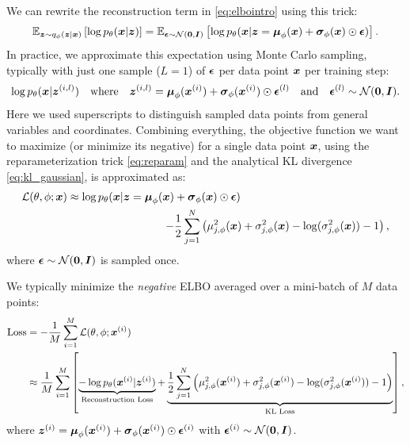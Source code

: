 We can rewrite the reconstruction term in \eqref{eq:elbointro} using this
trick:
\begin{align}
    \mathbb{E}_{\boldsymbol{z} \sim q_{\phi}(\boldsymbol{z}|\boldsymbol{x})} \left[ \log p_{\theta}(\boldsymbol{x}|\boldsymbol{z}) \right] = \mathbb{E}_{\boldsymbol{\epsilon} \sim \mathcal{N}(\mathbf{0}, \boldsymbol{I})} \left[ \log p_{\theta}(\boldsymbol{x}|\boldsymbol{z} = \boldsymbol{\mu}_{\phi}(\boldsymbol{x}) + \boldsymbol{\sigma}_{\phi}(\boldsymbol{x}) \odot \boldsymbol{\epsilon}) \right].
\end{align}
In practice, we approximate this expectation using Monte Carlo sampling, typically with just one sample ($L=1$) of $\boldsymbol{\epsilon}$ per data point $\boldsymbol{x}$ per training step:
\begin{align}
    \log p_{\theta}(\boldsymbol{x}|\boldsymbol{z}^{(i, l)}) \quad \text{where} \quad \boldsymbol{z}^{(i, l)} = \boldsymbol{\mu}_{\phi}(\boldsymbol{x}^{(i)}) +  \boldsymbol{\sigma}_{\phi}(\boldsymbol{x}^{(i)}) \odot \boldsymbol{\epsilon}^{(l)}  \quad \text{and} \quad \boldsymbol{\epsilon}^{(l)} \sim \mathcal{N}(\mathbf{0}, \boldsymbol{I}).
\end{align}
Here we used superscripts to distinguish sampled data points from general variables and coordinates. Combining everything, the objective function we want to maximize (or minimize its negative) for a single data point $\boldsymbol{x}$, using the reparameterization trick \eqref{eq:reparam} and the analytical KL divergence \eqref{eq:kl_gaussian}, is approximated as:
\begin{align}
    \mathcal{L}(\theta, \phi; \boldsymbol{x}) \approx \log p_{\theta}(\boldsymbol{x}|\boldsymbol{z} = \boldsymbol{\mu}_{\phi}(\boldsymbol{x}) & +  \boldsymbol{\sigma}_{\phi}(\boldsymbol{x}) \odot \boldsymbol{\epsilon} ) \nonumber                                                                            \\
    -                                                                                 & \frac{1}{2} \sum_{j=1}^{N} \left( \mu_{j, \phi}^2(\boldsymbol{x}) + \sigma_{j, \phi}^2(\boldsymbol{x}) - \log(\sigma_{j, \phi}^2(\boldsymbol{x})) - 1 \right),
    \label{eq:final_elbo_approx}
\end{align}
where $\boldsymbol{\epsilon} \sim \mathcal{N}(\mathbf{0}, \boldsymbol{I})$ is sampled once.

We typically minimize the \emph{negative} ELBO averaged over a mini-batch of
$M$ data points:
\begin{align}
    \text{Loss} & = -\frac{1}{M} \sum_{i=1}^M \mathcal{L}(\theta, \phi; \boldsymbol{x}^{(i)})                                                                                                                                                                                                                                                \\
                & \approx \frac{1}{M} \sum_{i=1}^M \left[ \underbrace{-\log p_{\theta}(\boldsymbol{x}^{(i)}|\boldsymbol{z}^{(i)})}_{\text{Reconstruction Loss}} + \underbrace{\frac{1}{2} \sum_{j=1}^{N} \left( \mu_{j, \phi}^2(\boldsymbol{x}^{(i)}) + \sigma_{j, \phi}^2(\boldsymbol{x}^{(i)}) - \log(\sigma_{j, \phi}^2(\boldsymbol{x}^{(i)})) - 1 \right)}_{\text{KL Loss}} \right],
    \label{eq:final_loss}
\end{align}
where $\boldsymbol{z}^{(i)} = \boldsymbol{\mu}_{\phi}(\boldsymbol{x}^{(i)}) +  \boldsymbol{\sigma}_{\phi}(\boldsymbol{x}^{(i)}) \odot \boldsymbol{\epsilon}^{(i)}$ with $\boldsymbol{\epsilon}^{(i)} \sim \mathcal{N}(\mathbf{0}, \boldsymbol{I})$.

